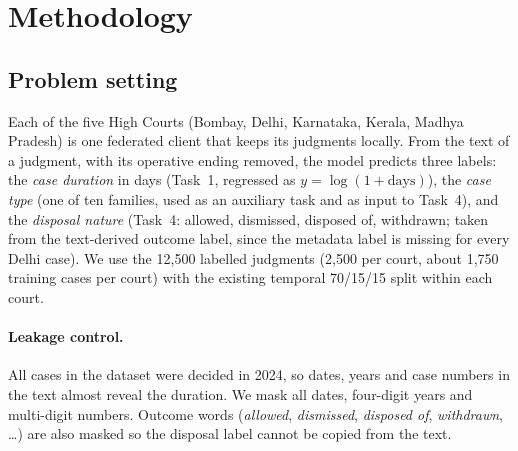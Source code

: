 
\section{Methodology}
\label{sec:method}

\subsection{Problem setting}
Each of the five High Courts (Bombay, Delhi, Karnataka, Kerala, Madhya Pradesh) is one federated client that keeps its judgments locally. From the text of a judgment, with its operative ending removed, the model predicts three labels: the \emph{case duration} in days (Task~1, regressed as $y=\log(1+\text{days})$), the \emph{case type} (one of ten families, used as an auxiliary task and as input to Task~4), and the \emph{disposal nature} (Task~4: allowed, dismissed, disposed of, withdrawn; taken from the text-derived outcome label, since the metadata label is missing for every Delhi case). We use the 12{,}500 labelled judgments (2{,}500 per court, about 1{,}750 training cases per court) with the existing temporal 70/15/15 split within each court.

\paragraph{Leakage control.} All cases in the dataset were decided in 2024, so dates, years and case numbers in the text almost reveal the duration. We mask all dates, four-digit years and multi-digit numbers. Outcome words (\emph{allowed}, \emph{dismissed}, \emph{disposed of}, \emph{withdrawn}, \dots) are also masked so the disposal label cannot be copied from the text.

